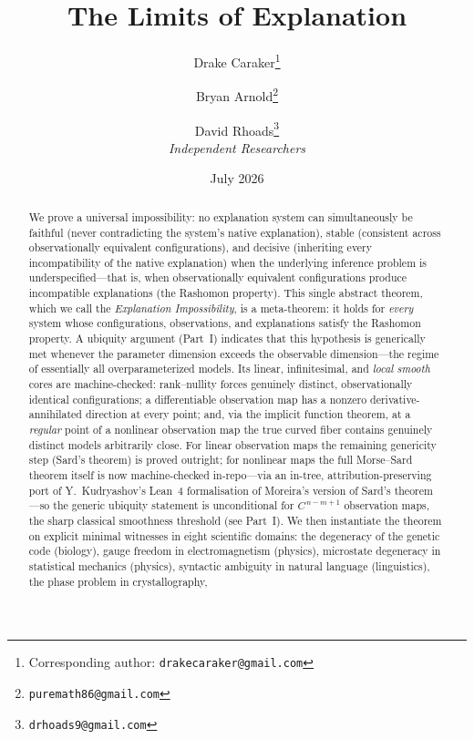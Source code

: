 \documentclass[11pt,a4paper]{article}
\title{The Limits of Explanation}
\author{%
  Drake Caraker\thanks{Corresponding author: \texttt{drakecaraker@gmail.com}}
  \and
  Bryan Arnold\thanks{\texttt{puremath86@gmail.com}}
  \and
  David Rhoads\thanks{\texttt{drhoads9@gmail.com}}
  \\[8pt]
  \textit{Independent Researchers}
}
\date{July 2026}
\begin{document}
\maketitle
\thispagestyle{empty}

\begin{abstract}
We prove a universal impossibility: no explanation system can simultaneously be
faithful (never contradicting the system's native explanation), stable
(consistent across observationally equivalent configurations), and decisive
(inheriting every incompatibility of the native explanation) when
the underlying inference problem is underspecified---that is, when
observationally equivalent configurations produce incompatible explanations
(the Rashomon property).
This single abstract theorem, which we call the \emph{Explanation
Impossibility}, is a meta-theorem: it holds for \emph{every} system whose
configurations, observations, and explanations satisfy the Rashomon property.
A ubiquity argument (Part~I) indicates that this hypothesis is generically met
whenever the parameter dimension exceeds the observable dimension---the regime
of essentially all overparameterized models.  Its linear, infinitesimal, and
\emph{local smooth} cores are machine-checked: rank--nullity forces genuinely
distinct, observationally identical configurations; a differentiable observation
map has a nonzero derivative-annihilated direction at every point; and, via the
implicit function theorem, at a \emph{regular} point of a nonlinear observation
map the true curved fiber contains genuinely distinct models arbitrarily close.
For linear observation maps the remaining genericity step (Sard's theorem) is
proved outright; for nonlinear maps the full Morse--Sard theorem itself is now
machine-checked in-repo---via an in-tree, attribution-preserving port of
Y.~Kudryashov's Lean~4 formalisation \citep{kudryashov2025sardmoreira} of
Moreira's version of Sard's theorem \citep{moreira2001hausdorff}---so the generic
ubiquity statement is unconditional for $C^{\,n-m+1}$ observation maps, the sharp
classical smoothness threshold (see Part~I).
We then instantiate the theorem on explicit minimal witnesses in
eight scientific domains: the degeneracy of the genetic code (biology),
gauge freedom in electromagnetism (physics), microstate degeneracy in
statistical mechanics (physics), syntactic ambiguity in natural
language (linguistics), the phase problem in crystallography,

\end{abstract}
\end{document}
